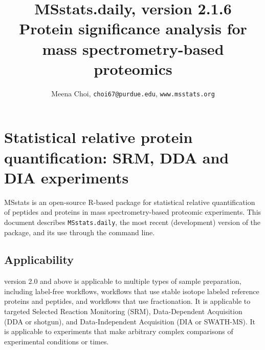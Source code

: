\documentclass[11pt]{article}
\begin{document}


\title{MSstats.daily, version 2.1.6 \\Protein significance analysis for mass spectrometry-based proteomics}

\author {Meena Choi, {\tt choi67@purdue.edu}, {\tt www.msstats.org}}
\maketitle
\tableofcontents

\newpage

\section{Statistical relative protein quantification: SRM, DDA and DIA experiments}

MSstats is an open-source R-based package for statistical relative quantification of peptides and proteins in mass spectrometry-based proteomic experiments. This document describes {\tt MSstats.daily}, the most recent (development) version of the package, and its use through the command line. 

\subsection*{Applicability}
\m version 2.0 and above is applicable to multiple types of sample preparation, including label-free workflows, workflows that use stable isotope labeled reference proteins and peptides, and workflows that use fractionation. It is applicable to targeted Selected Reaction Monitoring (SRM), Data-Dependent Acquisition (DDA or shotgun), and Data-Independent Acquisition (DIA or SWATH-MS). It is applicable to experiments that make arbitrary complex comparisons of experimental conditions or times. 
\end{document}
